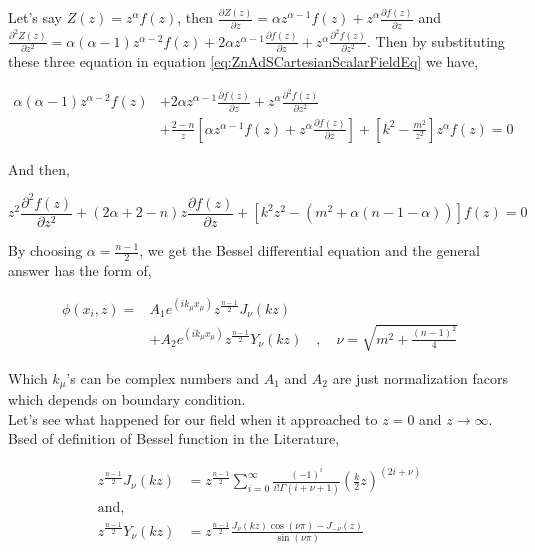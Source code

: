 Let's say $Z(z) = z^{\alpha}f(z)$, then $\frac{\partial Z(z)}{\partial z} = \alpha z^{\alpha-1}f(z) + z^{\alpha}\frac{\partial f(z)}{\partial z}$ and $\frac{\partial^2 Z(z)}{\partial z^2} = \alpha(\alpha-1)z^{\alpha-2}f(z) + 2\alpha z^{\alpha-1}\frac{\partial f(z)}{\partial z} + z^{\alpha}\frac{\partial^2 f(z)}{\partial z^2}$. Then by substituting these three equation in equation \ref{eq:ZnAdSCartesianScalarFieldEq} we have,

\begin{align}
    \alpha(\alpha-1)z^{\alpha-2}f(z) &+ 2\alpha z^{\alpha-1}\frac{\partial f(z)}{\partial z} + z^{\alpha}\frac{\partial^2 f(z)}{\partial z^2} \\ 
    &+ \frac{2-n}{z} \left[ \alpha z^{\alpha-1}f(z) + z^{\alpha}\frac{\partial f(z)}{\partial z} \right] + \left[k^2 - \frac{m^2}{z^2}\right]z^{\alpha}f(z) = 0 \nonumber
\end{align}

And then,

\begin{equation}
    z^{2}\frac{\partial^2 f(z)}{\partial z^2} + (2\alpha+2-n)z\frac{\partial f(z)}{\partial z} + \left[k^2 z^2 - (m^2 + \alpha(n-1-\alpha))\right]f(z) = 0 
\end{equation}

By choosing $\alpha = \frac{n-1}{2}$, we get the Bessel differential equation and the general answer has the form of,

\begin{align}
    \phi(x_i,z) =& A_1e^{(ik_\mu x_\mu)}z^{\frac{n-1}{2}}J_{\nu}(kz) \\
                & +A_2e^{(ik_\mu x_\mu)}z^{\frac{n-1}{2}}Y_{\nu}(kz) \quad , \quad \nu = \sqrt{m^2 + \frac{(n-1)^2}{4}} \nonumber  
\end{align}

Which $k_\mu$'s can be complex numbers and $A_1$ and $A_2$ are just normalization facors which depends on boundary condition.\\

Let's see what happened for our field when it approached to $z=0$ and $z\rightarrow\infty$. Bsed of definition of Bessel function in the Literature,  

\begin{align}
    z^{\frac{n-1}{2}}J_{\nu}(kz) &= z^{\frac{n-1}{2}} \sum\limits_{i=0}^{\infty} \frac{(-1)^i}{i!\Gamma(i+\nu+1)}(\frac{k}{2}z)^{(2i+\nu)} \\
    \text{and, } \nonumber\\
    z^{\frac{n-1}{2}}Y_{\nu}(kz) &= z^{\frac{n-1}{2}} \frac{J_{\nu}(kz)\cos{(\nu\pi)}-J_{-\nu}(z)}{\sin{(\nu\pi)}}
\end{align}

